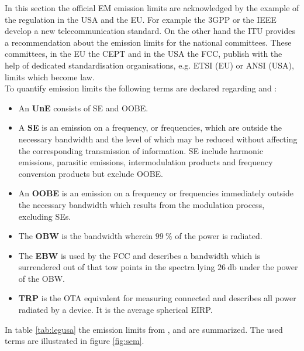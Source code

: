 In this section the official \ac{EM} emission limits are acknowledged by the example of the regulation in the \ac{USA} and the \ac{EU}. For example the \ac{3GPP} or the \ac{IEEE} develop a new telecommunication standard. On the other hand the \ac{ITU} provides a recommendation about the emission limits for the national committees. These committees, in the \ac{EU} the \ac{CEPT} and in the \ac{USA} the \ac{FCC}, publish with the help of dedicated standardisation organisations, e.g. \ac{ETSI} (\ac{EU}) or \ac{ANSI} (\ac{USA}), limits which become law.\\
To quantify emission limits the following terms are declared regarding \cite{seitur} and \cite{ctiaat}:

\begin{itemize}
\item An \textbf{\acf{UnE}} consists of \ac{SE} and \ac{OOBE}.
\item A \textbf{\acf{SE}} is an emission on a frequency, or frequencies, which are outside the necessary bandwidth and the level of which may be reduced without affecting the corresponding transmission of information. \acl{SE} include harmonic
emissions, parasitic emissions, intermodulation products and frequency conversion products but exclude \ac{OOBE}.
\item An \textbf{\acf{OOBE}} is an emission on a frequency or frequencies immediately outside the necessary bandwidth which results from the modulation process, excluding \aclp{SE}.
\item The \textbf{\acf{OBW}} is the bandwidth wherein $\SI{99}{\percent}$ of the power is radiated.
\item The \textbf{\acf{EBW}} is used by the \ac{FCC} and describes a bandwidth which is surrendered out of that tow points in the spectra lying $\SI{26}{\decibel}$ under the power of the \ac{OBW}. 
\item \textbf{\acf{TRP}} is the \ac{OTA} equivalent for measuring connected and describes all power radiated by a device. It is the average spherical \ac{EIRP}.
\end{itemize}


In table \ref{tab:legusa} the emission limits from \cite{ceptercrec}, \cite{ansi} and \cite{fcc} are summarized. The used terms are illustrated in figure \ref{fig:sem}.

